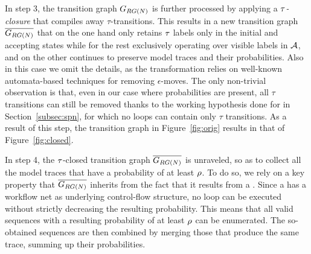 In step 3, the transition graph $G_{RG(N)}$ is further processed by applying a \emph{$\tau$-closure} that compiles away 
$\tau$-transitions. This results in a new transition graph $\overline{G_{RG(N)}}$ that on the one hand only retains $\tau$ labels only in the initial and accepting states while for the rest exclusively operating over visible labels in $\mathcal{A}$, and on the other continues to preserve model traces and their probabilities. Also in this case we omit the details, as the transformation relies on well-known automata-based techniques for removing $\epsilon$-moves. The only non-trivial observation is that, even in our case where probabilities are present, all $\tau$ transitions can still be removed thanks to the working hypothesis done for  in Section~\ref{subsec:spn}, for which no loops can contain only $\tau$ transitions. As a result of this step, the transition graph in Figure~\eqref{fig:orig} results in that of Figure~\eqref{fig:closed}.


In step 4, the $\tau$-closed transition graph $\overline{G_{RG(N)}}$ is unraveled, so as to collect all the model traces that have a probability of at least $\rho$. To do so, we rely on a key property that $\overline{G_{RG(N)}}$ inherits from the fact that it results from a \uswn. Since a \uswn has a workflow net as underlying control-flow structure, no loop can be executed without strictly decreasing the resulting probability. This means that all valid sequences with a resulting probability of at least $\rho$ can be enumerated. The so-obtained sequences are then combined by merging those that produce the same trace, summing up their probabilities.



